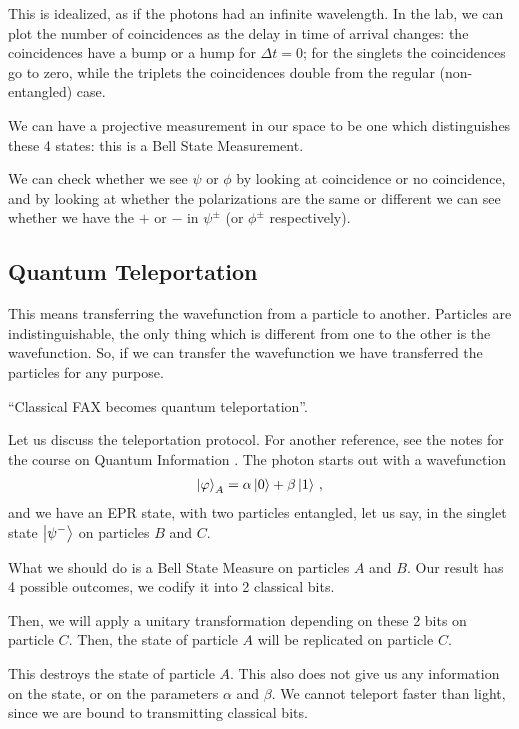 \documentclass[main.tex]{subfiles}
\begin{document}
This is idealized, as if the photons had an infinite wavelength. In the lab, we can plot the number of coincidences as the delay in time of arrival changes: the coincidences have a bump or a hump for \(\Delta t = 0\); for the singlets the coincidences go to zero, while the triplets the coincidences double from the regular (non-entangled) case.

We can have a projective measurement in our space to be one which distinguishes these 4 states: this is a Bell State Measurement. 

We can check whether we see \(\psi \) or \(\phi \) by looking at coincidence or no coincidence, and by looking at whether the polarizations are the same or different we can see whether we have the \(+\) or \(-\) in  \(\psi^{\pm }\) (or \(\phi^{\pm}\) respectively). 

\subsection{Quantum Teleportation}

This means transferring the wavefunction from a particle to another. 
Particles are indistinguishable, the only thing which is different from one to the other is the wavefunction. 
So, if we can transfer the wavefunction we have transferred the particles for any purpose. 

``Classical FAX becomes quantum teleportation''.

Let us discuss the teleportation protocol. For another reference, see the notes for the course on Quantum Information \cite[]{tissinoQuantumInformationNotes2019}. The photon starts out with a wavefunction 
%
\begin{align}
\ket{\varphi }_{A} = \alpha \ket{0} + \beta \ket{1}
\,,
\end{align}
%
and we have an EPR state, with two particles entangled, let us say, in the singlet state \(\ket{\psi^{-}}\) on particles \(B\) and \(C\). 

What we should do is a Bell State Measure on particles \(A\) and \(B\). Our result has 4 possible outcomes, we codify it into 2 classical bits.

Then, we will apply a unitary transformation depending on these 2 bits on particle \(C\). Then, the state of particle \(A\) will be replicated on particle \(C\).

This destroys the state of particle \(A\). 
This also does not give us any information on the state, or on the parameters \(\alpha \) and \(\beta \).
We cannot teleport faster than light, since we are bound to transmitting classical bits. 
\end{document}
